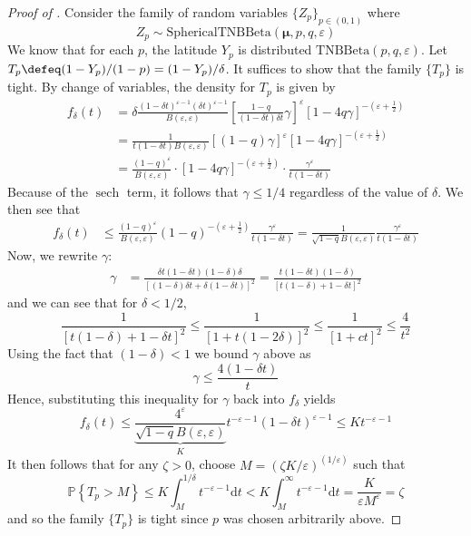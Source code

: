\begin{proof}[Proof of ]
Consider the family of random variables $\{Z_p\}_{p \in (0, 1)}$ where
\[
Z_p \sim \mathrm{SphericalTNBBeta}(\boldsymbol{\mu}, p, q, \varepsilon)
\]
We know that for each $p$, the latitude $Y_p$ is distributed $\mathrm{TNBBeta}(p, q, \varepsilon)$. Let
$T_p \defeq (1 - Y_p)/(1 - p) = (1 - Y_p)/\delta$. It suffices to show that the family $\{T_p\}$ is tight.
By change of variables, the density for $T_p$ is given by
\begin{align*}
    f_{\delta}(t) &= \delta\frac{(1 - \delta t)^{\varepsilon - 1}(\delta t)^{\varepsilon - 1}}{B(\varepsilon, \varepsilon)}\left[\frac{1 - q}{(1 - \delta t)\delta t}\gamma\right]^{\varepsilon}\left[1 - 4q\gamma\right]^{-\left(\varepsilon + \frac{1}{2}\right)} \\
    &= \frac{1}{t(1 - \delta t)B(\varepsilon, \varepsilon)}\left[(1 - q)\gamma\right]^{\varepsilon}\left[1 - 4q\gamma\right]^{-\left(\varepsilon + \frac{1}{2}\right)} \\
    &= \frac{(1 - q)^{\varepsilon}}{B(\varepsilon, \varepsilon)} \cdot \left[1 - 4q\gamma\right]^{-\left(\varepsilon + \frac{1}{2}\right)} \cdot \frac{\gamma^{\varepsilon}}{t(1 - \delta t)} 
\end{align*}
Because of the $\operatorname{sech}$ term, it follows that $\gamma \leq 1/4$ regardless of the value of $\delta$. We then see that
\begin{align*}
    f_{\delta}(t) &\leq \frac{(1 - q)^{\varepsilon}}{B(\varepsilon, \varepsilon)}(1 - q)^{-\left(\varepsilon + \frac{1}{2}\right)}\frac{\gamma^{\varepsilon}}{t(1 - \delta t)} = \frac{1}{\sqrt{1 - q}B(\varepsilon, \varepsilon)}\frac{\gamma^{\varepsilon}}{t(1 - \delta t)}
\end{align*}
Now, we rewrite $\gamma$:
\begin{align*}
    \gamma &= \frac{\delta t(1 - \delta t)(1 - \delta)\delta}{\left[(1 - \delta)\delta t + \delta(1 - \delta t)\right]^2} = \frac{t(1 - \delta t)(1 - \delta)}{\left[t(1 - \delta) + 1 - \delta t\right]^2}
\end{align*}
and we can see that for $\delta < 1/2$,
\[
    \frac{1}{\left[t(1 - \delta) + 1 - \delta t\right]^2} \leq \frac{1}{\left[1 + t(1 - 2\delta)\right]^2} \leq \frac{1}{\left[1 + ct\right]^2} \leq \frac{4}{t^2}
\]
Using the fact that $(1 - \delta) < 1$ we bound $\gamma$ above as
\[
    \gamma \leq \frac{4(1 - \delta t)}{t}
\]
Hence, substituting this inequality for $\gamma$ back into $f_{\delta}$ yields
\[
    f_{\delta}(t) \leq \underbrace{\frac{4^{\varepsilon}}{\sqrt{1 - q}B(\varepsilon, \varepsilon)}}_{K}t^{-\varepsilon - 1}(1 - \delta t)^{\varepsilon - 1} \leq Kt^{-\varepsilon - 1}
\]
It then follows that for any $\zeta > 0$, choose $M = (\zeta K/\varepsilon)^{(1/\varepsilon)}$ such that
\[
    \mathbb{P}\left\{T_p > M\right\} \leq K\int_M^{1/\delta} t^{-\varepsilon - 1}\mathrm{d}t < K\int_M^{\infty} t^{-\varepsilon - 1}\mathrm{d}t = \frac{K}{\varepsilon M^{\varepsilon}} = \zeta
\]
and so the family $\{T_p\}$ is tight since $p$ was chosen arbitrarily above.


\end{proof}
